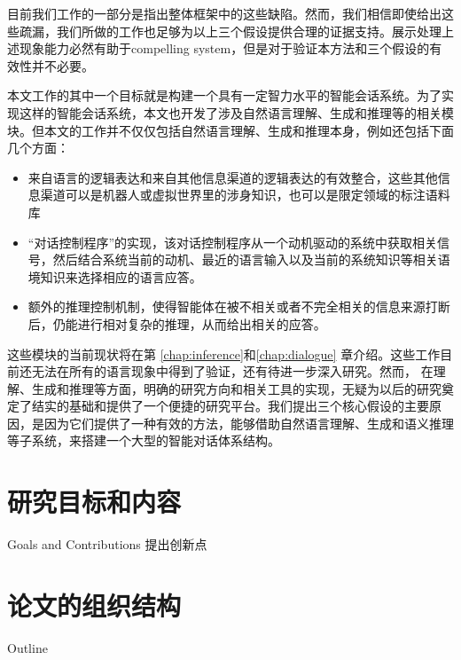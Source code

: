 目前我们工作的一部分是指出整体框架中的这些缺陷。然而，我们相信即使给出这些疏漏，我们所做的工作也足够为以上三个假设提供合理的证据支持。展示处理上述现象能力必然有助于compelling system，但是对于验证本方法和三个假设的有效性并不必要。

本文工作的其中一个目标就是构建一个具有一定智力水平的智能会话系统。为了实现这样的智能会话系统，本文也开发了涉及自然语言理解、生成和推理等的相关模块。但本文的工作并不仅仅包括自然语言理解、生成和推理本身，例如还包括下面几个方面：
\begin{itemize}
\item 来自语言的逻辑表达和来自其他信息渠道的逻辑表达的有效整合，这些其他信息渠道可以是机器人或虚拟世界里的涉身知识，也可以是限定领域的标注语料库
\item “对话控制程序”的实现，该对话控制程序从一个动机驱动的系统中获取相关信号，然后结合系统当前的动机、最近的语言输入以及当前的系统知识等相关语境知识来选择相应的语言应答。
\item 额外的推理控制机制，使得智能体在被不相关或者不完全相关的信息来源打断后，仍能进行相对复杂的推理，从而给出相关的应答。
\end{itemize}

这些模块的当前现状将在第 \ref{chap:inference}和\ref{chap:dialogue} 章介绍。这些工作目前还无法在所有的语言现象中得到了验证，还有待进一步深入研究。然而， 在理解、生成和推理等方面，明确的研究方向和相关工具的实现，无疑为以后的研究奠定了结实的基础和提供了一个便捷的研究平台。我们提出三个核心假设的主要原因，是因为它们提供了一种有效的方法，能够借助自然语言理解、生成和语义推理等子系统，来搭建一个大型的智能对话体系结构。

\section{研究目标和内容}{Goals and Contributions}
提出创新点

\section{论文的组织结构}{Outline}


